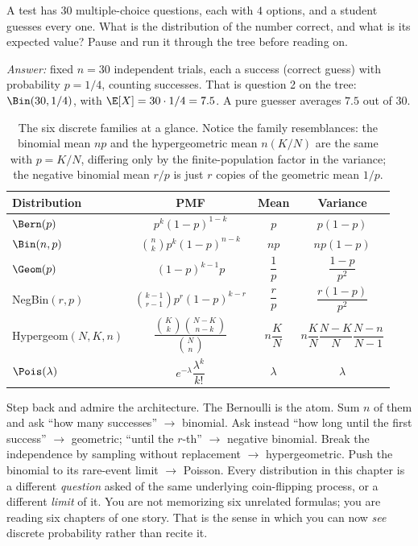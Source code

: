 \begin{walkbox}
A test has $30$ multiple-choice questions, each with $4$ options, and a student
guesses every one. What is the distribution of the number correct, and what is its
expected value? Pause and run it through the tree before reading on.

\emph{Answer:} fixed $n = 30$ independent trials, each a success (correct guess)
with probability $p = 1/4$, counting successes. That is question 2 on the tree:
$\Bin(30, 1/4)$, with $\E[X] = 30 \cdot 1/4 = 7.5$. A pure guesser averages $7.5$
out of $30$.
\end{walkbox}

\begin{table}[H]
\centering
\renewcommand{\arraystretch}{1.5}
\begin{tabular}{@{}lccc@{}}
\toprule
\textbf{Distribution} & \textbf{PMF} & \textbf{Mean} & \textbf{Variance} \\
\midrule
$\Bern(p)$ & $p^k(1-p)^{1-k}$ & $p$ & $p(1-p)$ \\
$\Bin(n,p)$ & $\binom{n}{k}p^k(1-p)^{n-k}$ & $np$ & $np(1-p)$ \\
$\Geom(p)$ & $(1-p)^{k-1}p$ & $\dfrac{1}{p}$ & $\dfrac{1-p}{p^2}$ \\
NegBin$(r,p)$ & $\binom{k-1}{r-1}p^r(1-p)^{k-r}$ & $\dfrac{r}{p}$ & $\dfrac{r(1-p)}{p^2}$ \\
Hypergeom$(N,K,n)$ & $\dfrac{\binom{K}{k}\binom{N-K}{n-k}}{\binom{N}{n}}$ & $n\dfrac{K}{N}$ & $n\dfrac{K}{N}\dfrac{N-K}{N}\dfrac{N-n}{N-1}$ \\
$\Pois(\lambda)$ & $e^{-\lambda}\dfrac{\lambda^k}{k!}$ & $\lambda$ & $\lambda$ \\
\bottomrule
\end{tabular}
\caption{The six discrete families at a glance. Notice the family resemblances:
the binomial mean $np$ and the hypergeometric mean $n(K/N)$ are the same with
$p = K/N$, differing only by the finite-population factor in the variance; the
negative binomial mean $r/p$ is just $r$ copies of the geometric mean $1/p$.}
\label{ch07:tab-summary}
\end{table}

\begin{happeningbox}
Step back and admire the architecture. The Bernoulli is the atom. Sum $n$ of them
and ask ``how many successes'' $\to$ binomial. Ask instead ``how long until the
first success'' $\to$ geometric; ``until the $r$-th'' $\to$ negative binomial.
Break the independence by sampling without replacement $\to$ hypergeometric. Push
the binomial to its rare-event limit $\to$ Poisson. Every distribution in this
chapter is a different \emph{question} asked of the same underlying coin-flipping
process, or a different \emph{limit} of it. You are not memorizing six unrelated
formulas; you are reading six chapters of one story. That is the sense in which you
can now \emph{see} discrete probability rather than recite it.
\end{happeningbox}


